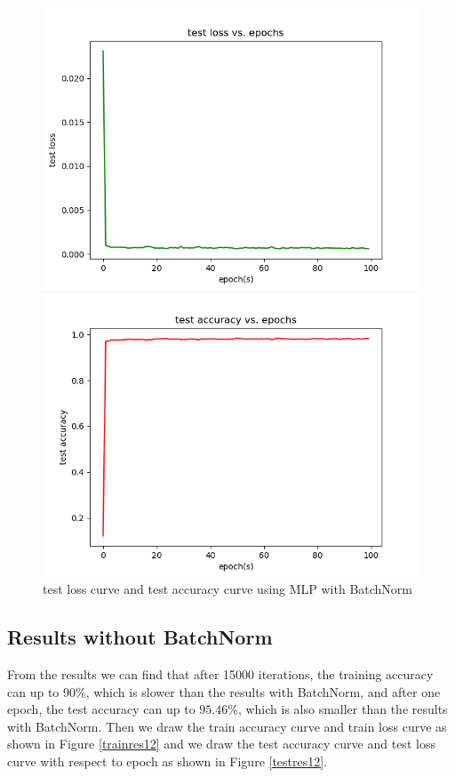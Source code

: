 \documentclass{elegantbook}
\begin{document}
\begin{figure}[!h]
	\centering
	\begin{minipage}[t]{0.48\textwidth}
		\centering
		\includegraphics[width=\textwidth]{../results/testloss11}
	\end{minipage}
	\begin{minipage}[t]{0.48\textwidth}
		\centering
		\includegraphics[width=\textwidth]{../results/testacc11}
	\end{minipage}
	\caption{\label{testres11}test loss curve and test accuracy curve using MLP with BatchNorm}
\end{figure}

\subsection{Results without BatchNorm}
From the results we can find that after 15000 iterations, the training accuracy can up to $90\%$, which is slower than the results with BatchNorm, and after one epoch, the test accuracy can up to $95.46\%$, which is also smaller than the results with BatchNorm. Then we draw the train accuracy curve and train loss curve as shown in Figure \ref{trainres12} and we draw the test accuracy curve and test loss curve with respect to epoch as shown in Figure \ref{testres12}.
\end{document}
